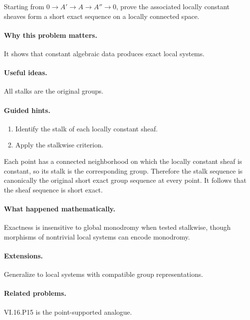 \begin{problem}\label{prob:vi16-p16}
Starting from $0\to A'\to A\to A''\to0$, prove the associated locally constant sheaves form a short exact sequence on a locally connected space.
\end{problem}

\ifdefined\FullProblemDossiers
\paragraph{Why this problem matters.}
It shows that constant algebraic data produces exact local systems.

\paragraph{Useful ideas.}
All stalks are the original groups.

\paragraph{Guided hints.}
\begin{enumerate}
\item Identify the stalk of each locally constant sheaf.
\item Apply the stalkwise criterion.
\end{enumerate}

\begin{solution}
Each point has a connected neighborhood on which the locally constant sheaf is constant, so its stalk is the corresponding group.  Therefore the stalk sequence is canonically the original short exact group sequence at every point.  It follows that the sheaf sequence is short exact.
\end{solution}

\paragraph{What happened mathematically.}
Exactness is insensitive to global monodromy when tested stalkwise, though morphisms of nontrivial local systems can encode monodromy.

\paragraph{Extensions.}
Generalize to local systems with compatible group representations.

\paragraph{Related problems.}
VI.16.P15 is the point-supported analogue.
\fi
